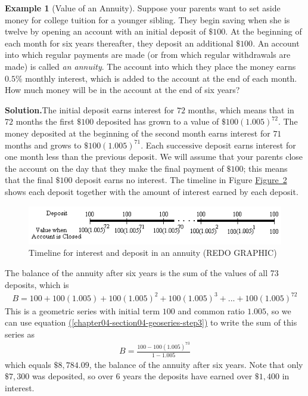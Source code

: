 \documentclass[10pt,]{book}
\theoremstyle{plain}
\theoremstyle{definition}
\theoremstyle{definition}
\newtheorem{example}[theorem]{Example}
\theoremstyle{definition}
\numberwithin{equation}{section}
\begin{document}
\begin{example}[Value of an Annuity]\label{value-on-an-annuity}
Suppose your parents want to set aside money for college tuition for a younger sibling.  They begin saving when she is twelve by opening an account with an initial deposit of \(\$100\).  At the beginning of each month for six years thereafter, they deposit an additional \(\$100\).  An account into which regular payments are made (or from which regular withdrawals are made) is called \emph{an annuity}.  The account into which they place the money earns \(0.5\%\) monthly interest, which is added to the account at the end of each month.  How much money will be in the account at the end of six years?%
\par\medskip\noindent%
\textbf{Solution.}\quad The initial deposit earns interest for \(72\) months, which means that in \(72\) months the first \(\$100\) deposited has grown to a value of \(\$100(1.005)^{72}\).  The money deposited at the beginning of the second month earns interest for \(71\) months and grows to \(\$100(1.005)^{71}\).  Each successive deposit earns interest for one month less than the previous deposit.  We will assume that your parents close the account on the day that they make the final payment of \(\$100\); this means that the final \(\$100\) deposit earns no interest.  The timeline in Figure \hyperref[deposit-timeline]{Figure~2} shows each deposit together with the amount of interest earned by each deposit.%
\begin{figure}
\centering
\includegraphics[width=0.8\linewidth]{src/images/chapter04-section04-depositchart.png}
\caption{Timeline for interest and deposit in an annuity (REDO GRAPHIC)\label{deposit-timeline}}
\end{figure}
The balance of the annuity after six years is the sum of the values of all 73 deposits, which is%
\begin{gather*}
B = 100 + 100(1.005) + 100(1.005)^2 + 100(1.005)^3 + ... + 100(1.005)^{72}
\end{gather*}
This is a geometric series with initial term \(100\) and common ratio \(1.005\), so we can use equation \hyperref[chapter04-section04-geoseries-step3]{(\ref{chapter04-section04-geoseries-step3})} to write the sum of this series as%
\begin{gather}
B= \frac{100-100(1.005)^{73}}{1-1.005}\label{mrow-80}
\end{gather}
which equals \(\$8,784.09\), the balance of the annuity after six years.  Note that only \(\$7,300\) was deposited, so over \(6\) years the deposits have earned over \(\$1,400\) in interest.%
\end{example}
\end{document}
